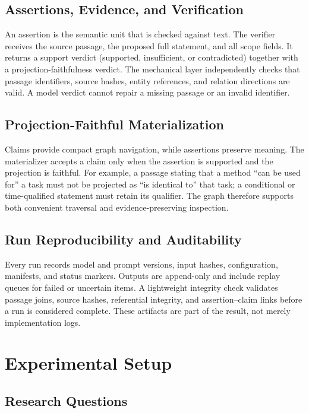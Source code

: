 \documentclass[11pt]{article}
\begin{document}
\subsection{Assertions, Evidence, and Verification}

An assertion is the semantic unit that is checked against text. The verifier receives the source passage, the proposed full statement, and all scope fields. It returns a support verdict (supported, insufficient, or contradicted) together with a projection-faithfulness verdict. The mechanical layer independently checks that passage identifiers, source hashes, entity references, and relation directions are valid. A model verdict cannot repair a missing passage or an invalid identifier.

\subsection{Projection-Faithful Materialization}

Claims provide compact graph navigation, while assertions preserve meaning. The materializer accepts a claim only when the assertion is supported and the projection is faithful. For example, a passage stating that a method ``can be used for'' a task must not be projected as ``is identical to'' that task; a conditional or time-qualified statement must retain its qualifier. The graph therefore supports both convenient traversal and evidence-preserving inspection.

\subsection{Run Reproducibility and Auditability}

Every run records model and prompt versions, input hashes, configuration, manifests, and status markers. Outputs are append-only and include replay queues for failed or uncertain items. A lightweight integrity check validates passage joins, source hashes, referential integrity, and assertion--claim links before a run is considered complete. These artifacts are part of the result, not merely implementation logs.

\section{Experimental Setup}
\label{sec:setup}

\subsection{Research Questions}
\end{document}

